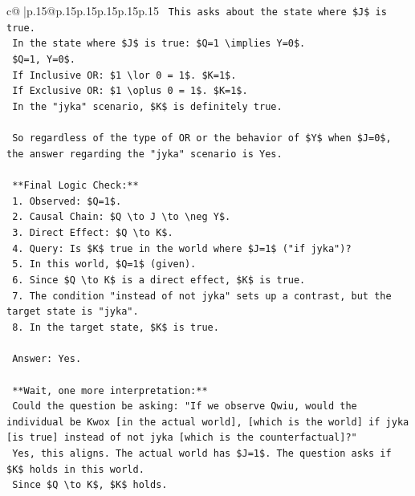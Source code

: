 \documentclass{article}
\begin{document}
{\begin{supertabular}{c@{$\;$}|p{.15\linewidth}@{}p{.15\linewidth}p{.15\linewidth}p{.15\linewidth}p{.15\linewidth}p{.15\linewidth}}
{{{\texttt{    This asks about the state where \$J\$ is true.} \\
\texttt{    In the state where \$J\$ is true: \$Q=1 \textbackslash{}implies Y=0\$.} \\
\texttt{    \$Q=1, Y=0\$.} \\
\texttt{    If Inclusive OR: \$1 \textbackslash{}lor 0 = 1\$. \$K=1\$.} \\
\texttt{    If Exclusive OR: \$1 \textbackslash{}oplus 0 = 1\$. \$K=1\$.} \\
\texttt{    In the "jyka" scenario, \$K\$ is definitely true.} \\
\\ 
\texttt{    So regardless of the type of OR or the behavior of \$Y\$ when \$J=0\$, the answer regarding the "jyka" scenario is Yes.} \\
\\ 
\texttt{    **Final Logic Check:**} \\
\texttt{    1. Observed: \$Q=1\$.} \\
\texttt{    2. Causal Chain: \$Q \textbackslash{}to J \textbackslash{}to \textbackslash{}neg Y\$.} \\
\texttt{    3. Direct Effect: \$Q \textbackslash{}to K\$.} \\
\texttt{    4. Query: Is \$K\$ true in the world where \$J=1\$ ("if jyka")?} \\
\texttt{    5. In this world, \$Q=1\$ (given).} \\
\texttt{    6. Since \$Q \textbackslash{}to K\$ is a direct effect, \$K\$ is true.} \\
\texttt{    7. The condition "instead of not jyka" sets up a contrast, but the target state is "jyka".} \\
\texttt{    8. In the target state, \$K\$ is true.} \\
\\ 
\texttt{    Answer: Yes.} \\
\\ 
\texttt{    **Wait, one more interpretation:**} \\
\texttt{    Could the question be asking: "If we observe Qwiu, would the individual be Kwox {[}in the actual world{]}, {[}which is the world{]} if jyka {[}is true{]} instead of not jyka {[}which is the counterfactual{]}?"} \\
\texttt{    Yes, this aligns. The actual world has \$J=1\$. The question asks if \$K\$ holds in this world.} \\
\texttt{    Since \$Q \textbackslash{}to K\$, \$K\$ holds.} \\
}}}
\end{supertabular}}
\end{document}
